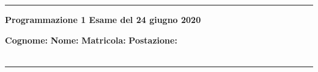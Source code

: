 
















% 

%
\thispagestyle{empty}
\hrule
\begin{center}
   {\Large {\bf Programmazione 1 \hspace{3cm} Esame del 24 giugno 2020}}
\end{center}
{\bf Cognome: }\hspace{2.5cm} {\bf Nome: } \hspace{2.5cm} {\bf Matricola: } \hspace{2.5cm} {\bf Postazione: } \\\
\hrule


